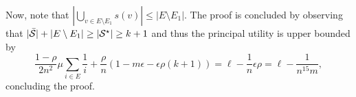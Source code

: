     Now, note that $|\bigcup_{v\in E\setminus E_1}s(v)|\le |E\setminus E_1|$. The proof is concluded by observing that $|\bar {\mathcal{S}}|+|E\setminus E_1|\ge |\mathcal{S}^\star|\ge k+1$ and thus the principal utility is upper bounded by
	\[
	\frac{1-\rho}{2n^2}\mu\sum_{i\in E}\frac{1}{i}+\frac{\rho}{n}\left(1-m\epsilon-\epsilon\rho(k+1)\right)=\ell-\frac{1}{n}\epsilon\rho=\ell-\frac{1}{n^{15}m},
	\]
    concluding the proof.
